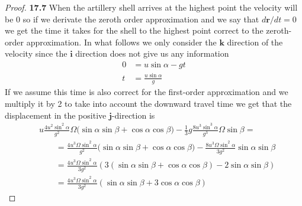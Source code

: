 \documentclass[11pt]{article}
\theoremstyle{definition}
\begin{document}
\begin{proof}{\textbf{17.7}}
    When the artillery shell arrives at the highest point the velocity will be
    $0$ so if we derivate the zeroth order approximation and we say that
    $d\bm{r}/dt = 0$ we get the time it takes for the shell to 
    the highest point correct to the zeroth-order approximation.
    In what follows we only consider the $\bm{k}$ direction of the velocity
    since the $\bm{i}$ direction does not give us any information 
    \begin{align*}
        0 &= u\sin\alpha - gt\\
        t &= \frac{u\sin\alpha}{g}
    \end{align*}
    If we assume this time is also correct for the first-order approximation
    and we multiply it by 2 to take into account the downward travel time we
    get that the displacement in the positive $\bm{j}$-direction is
    \begin{align*}
        &
        u\frac{4u^2\sin^2\alpha}{g^2}\Omega\bigg(\sin\alpha\sin\beta
        + \cos\alpha\cos\beta\bigg)
        -\frac{1}{3}g\frac{8u^3\sin^3\alpha}{g^3}\Omega\sin\beta =\\
        &\qquad= \frac{4u^3\Omega\sin^2\alpha}{g^2}\bigg(\sin\alpha\sin\beta
        + \cos\alpha\cos\beta\bigg)
        - \frac{8u^3\Omega\sin^2\alpha}{3g^2}\sin\alpha\sin\beta\\
        &\qquad= \frac{4u^3\Omega\sin^2\alpha}{3g^2}
        (3(\sin\alpha\sin\beta + \cos\alpha\cos\beta) - 2\sin\alpha\sin\beta)\\
        &\qquad= \frac{4u^3\Omega\sin^2\alpha}{3g^2}
        (\sin\alpha\sin\beta + 3\cos\alpha\cos\beta)
    \end{align*}
\end{proof}
\cleardoublepage
\end{document}

